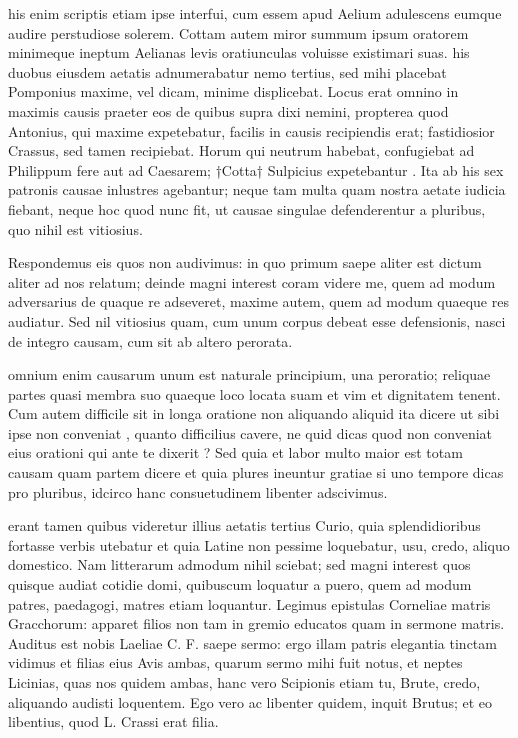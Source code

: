  his enim scriptis etiam ipse interfui, cum essem apud Aelium adulescens eumque audire perstudiose solerem. Cottam autem miror summum ipsum oratorem minimeque ineptum Aelianas levis oratiunculas voluisse existimari suas. his duobus eiusdem aetatis adnumerabatur nemo tertius, sed mihi placebat Pomponius maxime, vel dicam, minime displicebat. Locus erat omnino in maximis causis praeter eos de quibus supra dixi nemini, propterea quod Antonius, qui maxime expetebatur, facilis in causis recipiendis erat; fastidiosior Crassus, sed tamen recipiebat. Horum qui neutrum habebat, confugiebat ad Philippum fere aut ad Caesarem; †Cotta† Sulpicius expetebantur . Ita ab his sex patronis causae inlustres agebantur; neque tam multa quam nostra aetate iudicia fiebant, neque hoc quod nunc fit, ut causae singulae defenderentur a pluribus, quo nihil est vitiosius.

 Respondemus eis quos non audivimus: in quo primum saepe aliter est dictum aliter ad nos relatum; deinde magni interest coram videre me, quem ad modum adversarius de quaque re adseveret, maxime autem, quem ad modum quaeque res audiatur. Sed nil vitiosius quam, cum unum corpus debeat esse defensionis, nasci de integro causam, cum sit ab altero perorata.

 omnium enim causarum unum est naturale principium, una peroratio; reliquae partes quasi membra suo quaeque loco locata suam et vim et dignitatem tenent. Cum autem difficile sit in longa oratione non aliquando aliquid ita dicere ut sibi ipse non conveniat , quanto difficilius cavere, ne quid dicas quod non conveniat eius orationi qui ante te dixerit ? Sed quia et labor multo maior est totam causam quam partem dicere et quia plures ineuntur gratiae si uno tempore dicas pro pluribus, idcirco hanc consuetudinem libenter adscivimus.

 erant tamen quibus videretur illius aetatis tertius Curio, quia splendidioribus fortasse verbis utebatur et quia Latine non pessime loquebatur, usu, credo, aliquo domestico. Nam litterarum admodum nihil sciebat; sed magni interest quos quisque audiat cotidie domi, quibuscum loquatur a puero, quem ad modum patres, paedagogi, matres etiam loquantur. Legimus epistulas Corneliae matris Gracchorum: apparet filios non tam in gremio educatos quam in sermone matris. Auditus est nobis Laeliae C. F. saepe sermo: ergo illam patris elegantia tinctam vidimus et filias eius Avis ambas, quarum sermo mihi fuit notus, et neptes Licinias, quas nos quidem ambas, hanc vero Scipionis etiam tu, Brute, credo, aliquando audisti loquentem. Ego vero ac libenter quidem, inquit Brutus; et eo libentius, quod L. Crassi erat filia.

